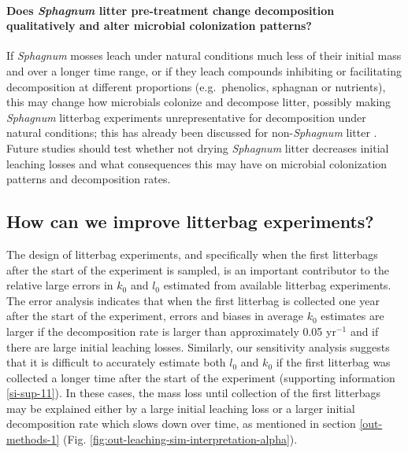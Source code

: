 \documentclass[bg, manuscript]{copernicus}
\begin{document}
\paragraph*{\texorpdfstring{Does \emph{Sphagnum} litter pre-treatment change decomposition qualitatively and alter microbial colonization patterns?}{Does Sphagnum litter pre-treatment change decomposition qualitatively and alter microbial colonization patterns?}}

If \emph{Sphagnum} mosses leach under natural conditions much less of their initial mass and over a longer time range, or if they leach compounds inhibiting or facilitating decomposition at different proportions (e.g.~phenolics, sphagnan \citep{Fenner.2011, Hajek.2011, Hajek.2024} or nutrients), this may change how microbials colonize and decompose litter, possibly making \emph{Sphagnum} litterbag experiments unrepresentative for decomposition under natural conditions; this has already been discussed for non-\emph{Sphagnum} litter \citep{Barlocher.1997}. Future studies should test whether not drying \emph{Sphagnum} litter decreases initial leaching losses and what consequences this may have on microbial colonization patterns and decomposition rates.

\hypertarget{out-discussion-5}{%
\subsection{How can we improve litterbag experiments?}\label{out-discussion-5}}

The design of litterbag experiments, and specifically when the first litterbags after the start of the experiment is sampled, is an important contributor to the relative large errors in \(k_0\) and \(l_0\) estimated from available litterbag experiments. The error analysis indicates that when the first litterbag is collected one year after the start of the experiment, errors and biases in average \(k_0\) estimates are larger if the decomposition rate is larger than approximately 0.05 yr\(^{-1}\) and if there are large initial leaching losses. Similarly, our sensitivity analysis suggests that it is difficult to accurately estimate both \(l_0\) and \(k_0\) if the first litterbag was collected a longer time after the start of the experiment (supporting information \ref{si-sup-11}). In these cases, the mass loss until collection of the first litterbags may be explained either by a large initial leaching loss or a larger initial decomposition rate which slows down over time, as mentioned in section \ref{out-methods-1} (Fig. \ref{fig:out-leaching-sim-interpretation-alpha}).
\end{document}
